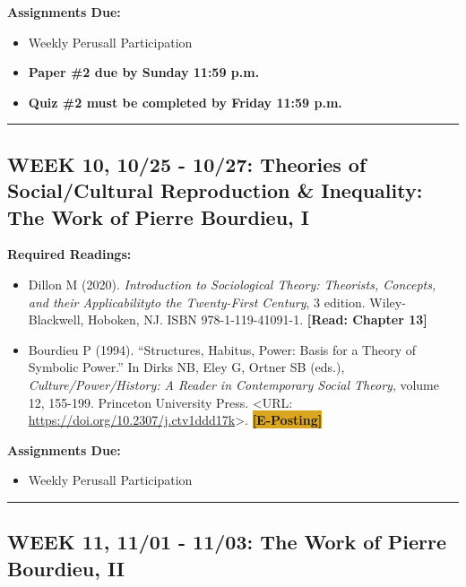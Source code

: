 \documentclass[11pt,]{article}
\providecommand{\tightlist}{%
  \setlength{\itemsep}{0pt}\setlength{\parskip}{0pt}}
\begin{document}
\textbf{Assignments Due:}

\begin{itemize}
\tightlist
\item
  Weekly Perusall Participation
\item
  \textbf{Paper \#2 due by Sunday 11:59 p.m.}
\item
  \textbf{Quiz \#2 must be completed by Friday 11:59 p.m.}
\end{itemize}

\bigbreak
\hrule

\hypertarget{week-10-1025---1027-theories-of-socialcultural-reproduction-inequality-the-work-of-pierre-bourdieu-i}{%
\subsection{WEEK 10, 10/25 - 10/27: Theories of Social/Cultural
Reproduction \& Inequality: The Work of Pierre Bourdieu,
I}\label{week-10-1025---1027-theories-of-socialcultural-reproduction-inequality-the-work-of-pierre-bourdieu-i}}

\textbf{Required Readings:}

\begin{itemize}
\item
  Dillon M (2020). \emph{Introduction to Sociological Theory: Theorists,
  Concepts, and their Applicabilityto the Twenty-First Century}, 3
  edition. Wiley-Blackwell, Hoboken, NJ. ISBN 978-1-119-41091-1.
  \textcolor{BrickRed}{\bf{[Read: Chapter 13]}}
\item
  Bourdieu P (1994). ``Structures, Habitus, Power: Basis for a Theory of
  Symbolic Power.'' In Dirks NB, Eley G, Ortner SB (eds.),
  \emph{Culture/Power/History: A Reader in Contemporary Social Theory},
  volume 12, 155-199. Princeton University Press. \textless URL:
  \url{https://doi.org/10.2307/j.ctv1ddd17k}\textgreater.
  \colorbox{Goldenrod}{\bf{[E-Posting]}}
\end{itemize}

\textbf{Assignments Due:}

\begin{itemize}
\tightlist
\item
  Weekly Perusall Participation
\end{itemize}

\bigbreak
\hrule

\hypertarget{week-11-1101---1103-the-work-of-pierre-bourdieu-ii}{%
\subsection{WEEK 11, 11/01 - 11/03: The Work of Pierre Bourdieu,
II}\label{week-11-1101---1103-the-work-of-pierre-bourdieu-ii}}
\end{document}

